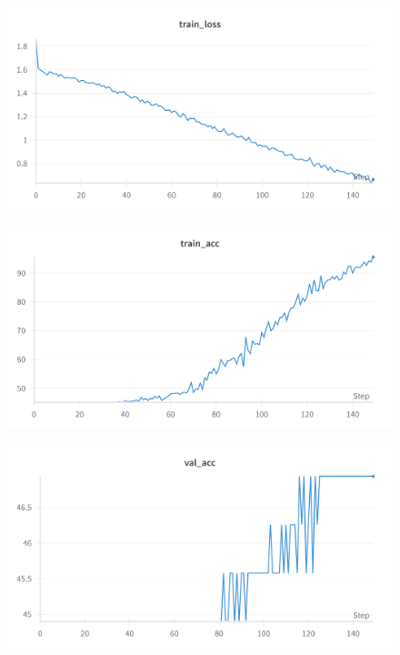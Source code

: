 \documentclass{article}
\begin{document}
\begin{figure}[hbtp]
    \centering

    \begin{minipage}{0.6\textwidth}
        \centering
        \includegraphics[width=\textwidth]{Images/cnn1_train_loss.png}
        \label{fig:cnn1_train_loss}
    \end{minipage}

    \vspace*{0.4cm}

    \begin{minipage}{0.6\textwidth}
        \centering
        \includegraphics[width=\textwidth]{Images/cnn1_train_acc.png}
        \label{fig:cnn1_train_acc}
    \end{minipage}

    \vspace*{0.4cm}

    \begin{minipage}{0.6\textwidth}
        \centering
        \includegraphics[width=\textwidth]{Images/cnn1_val_acc.png}
        \label{fig:cnn1_val_acc}
    \end{minipage}


\end{figure}
\end{document}
